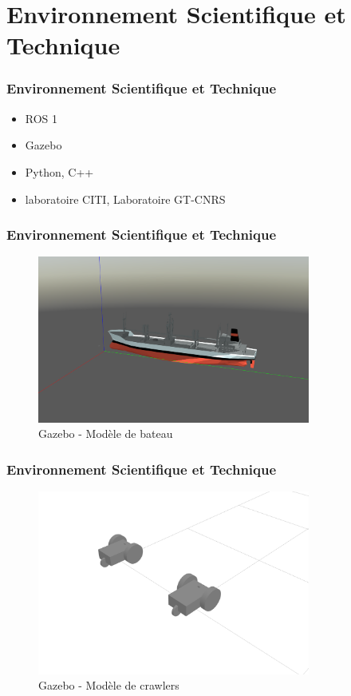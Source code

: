 \documentclass{beamer}
\begin{document}
	\section{Environnement Scientifique et Technique}
		\begin{frame}
			\frametitle{Environnement Scientifique et Technique}
			\begin{itemize}
				\item ROS 1
				\item Gazebo
				\item Python, C++
				\item laboratoire CITI, Laboratoire GT-CNRS
			\end{itemize}
		\end{frame}
		\begin{frame}
			\frametitle{Environnement Scientifique et Technique}
			\begin{figure}
				\centering
				\includegraphics[width=0.8\textwidth]{graphics/boat.png}
				\caption{Gazebo - Modèle de bateau}
			\end{figure}
		\end{frame}
		\begin{frame}
			\frametitle{Environnement Scientifique et Technique}
			\begin{figure}
				\centering
				\includegraphics[width=0.8\textwidth]{graphics/crawlers.png}
				\caption{Gazebo - Modèle de crawlers}
			\end{figure}
		\end{frame}
\end{document}
